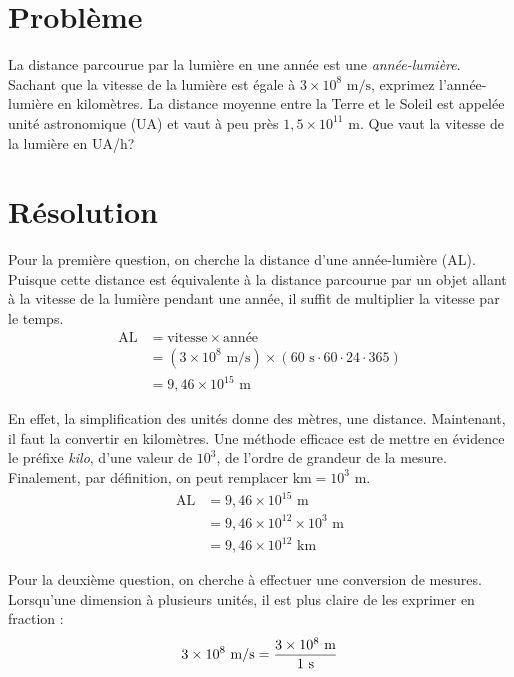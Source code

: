 \documentclass[11pt]{article}
\begin{document}
\section*{Problème}
La distance parcourue par la lumière en une année est une \textit{année-lumière}. Sachant que la vitesse de la lumière est égale à $3\times10^8\text{ m/s}$, exprimez l'année-lumière en kilomètres. La distance moyenne entre la Terre et le Soleil est appelée unité astronomique (UA) et vaut à peu près $1,5\times10^{11}\text{ m}$. Que vaut la vitesse de la lumière en UA/h? \cite{problem}

\section*{Résolution}
Pour la première question, on cherche la distance d'une année-lumière (AL). Puisque cette distance est équivalente à la distance parcourue par un objet allant à la vitesse de la lumière pendant une année, il suffit de multiplier la vitesse par le temps.
\begin{equation*}
\begin{split}
\text{AL}&=\text{vitesse}\times\text{année}\\
         &=(3\times10^8\text{ m/s})\times(60\text{ s}\cdot60\cdot24\cdot365)\\
         &=9,46\times10^{15}\text{ m}
\end{split}
\end{equation*}

En effet, la simplification des unités donne des mètres, une distance. Maintenant, il faut la convertir en kilomètres. Une méthode efficace est de mettre en évidence le préfixe \textit{kilo}, d'une valeur de $10^3$, de l'ordre de grandeur de la mesure. Finalement, par définition, on peut remplacer $\text{km}=10^3\text{ m}$.
\begin{equation*}
\begin{split}
\text{AL}&=9,46\times10^{15}\text{ m}\\
         &=9,46\times10^{12}\times10^{3}\text{ m}\\
         &=9,46\times10^{12}\text{ km}
\end{split}
\end{equation*}

Pour la deuxième question, on cherche à effectuer une conversion de mesures. Lorsqu'une dimension à plusieurs unités, il est plus claire de les exprimer en fraction :
\begin{equation*}
3\times10^8\text{ m/s}=\frac{3\times10^8\text{ m}}{1\text{ s}}\\
\end{equation*}
\end{document}
